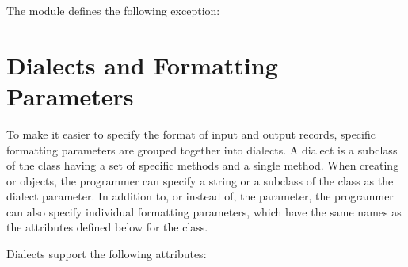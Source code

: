 \documentclass[letterpaper,10pt,english]{sphinxmanual}
\begin{document}
The {\hyperref[\detokenize{csv:module-csv}]{}} module defines the following exception:

\vspace{5px}




\section{Dialects and Formatting Parameters}
\label{\detokenize{csv:dialects-and-formatting-parameters}}\label{\detokenize{csv:csv-fmt-params}}
To make it easier to specify the format of input and output records, specific
formatting parameters are grouped together into dialects.  A dialect is a
subclass of the {\hyperref[\detokenize{csv:csv.Dialect}]{}} class having a set of specific methods and a
single  method.  When creating {\hyperref[\detokenize{csv:csv.reader}]{}} or
{\hyperref[\detokenize{csv:csv.writer}]{}} objects, the programmer can specify a string or a subclass of
the {\hyperref[\detokenize{csv:csv.Dialect}]{}} class as the dialect parameter.  In addition to, or instead
of, the  parameter, the programmer can also specify individual
formatting parameters, which have the same names as the attributes defined below
for the {\hyperref[\detokenize{csv:csv.Dialect}]{}} class.

Dialects support the following attributes:
\end{document}
